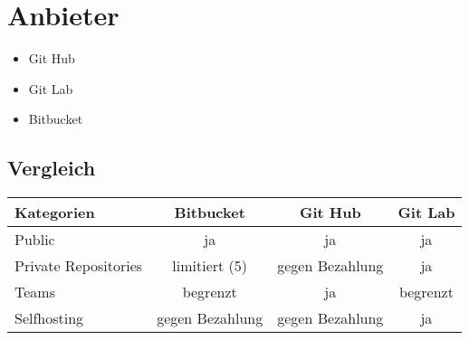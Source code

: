 \section{Anbieter}
\begin{frame}
\begin{itemize}
	\item Git Hub
	\item Git Lab
	\item Bitbucket
\end{itemize}
\end{frame}
\subsection{Vergleich}
\begin{frame}
	\begin{tabular}{l|c|c|c}
		Kategorien & Bitbucket & Git Hub & Git Lab \\\hline
		Public & ja & ja & ja\\
		Private Repositories & limitiert (5) & gegen Bezahlung & ja \\
		Teams & begrenzt & ja & begrenzt\\
		Selfhosting & gegen Bezahlung & gegen Bezahlung & ja \\
	\end{tabular}
\end{frame}